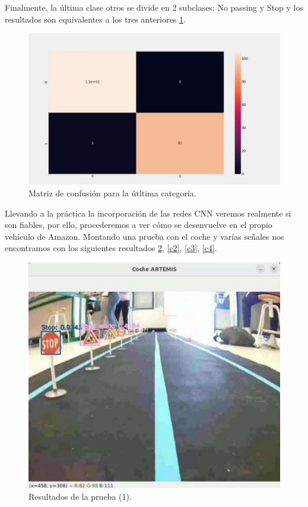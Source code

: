 Finalmente, la última clase otros se divide en 2 subclases: No passing y Stop y los resultados son equivalentes a los tres anteriores \ref{otrosconf}.\\

\begin{figure}[H]
    \centering
 	\includegraphics[width=\textwidth]{Imagenes/IA/otros_confusion.pdf}
    \caption{Matriz de confusión para la útltima categoría.}
    \label{otrosconf}
\end{figure}


Llevando a la práctica la incorporación de las redes CNN veremos realmente si son fiables, por ello, procederemos a ver cómo se desenvuelve en el propio vehículo de Amazon. Montando una prueba con el coche y varías señales nos encontramos con los siguientes resultados \ref{c1}, \ref{c2}, \ref{c3}, \ref{c4}.\\

\begin{figure}[H]
    \centering
 	\includegraphics[width=\textwidth]{Imagenes/IA/YoloCNN_coche.pdf}
    \caption{Resultados de la prueba (1).}
    \label{c1}
\end{figure}


